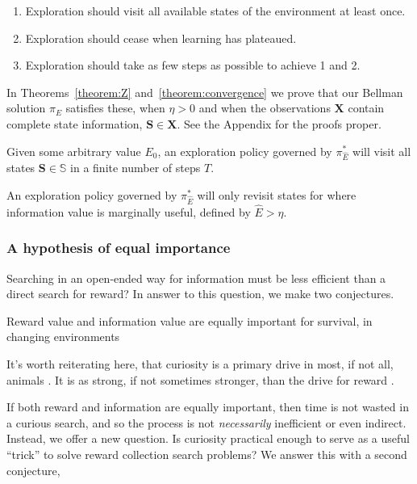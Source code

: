\begin{enumerate}
	\item Exploration should visit all available states of the environment at least once.
	\item Exploration should cease when learning has plateaued.
	\item Exploration should take as few steps as possible to achieve 1 and 2.
\end{enumerate}

In Theorems~\ref{theorem:Z} and~\ref{theorem:convergence} we prove that our Bellman solution $\pi_E$ satisfies these, when $\eta > 0$ and when the observations $\mathbf{X}$ contain complete state information, $\mathbf{S} \in \mathbf{X}$. See the Appendix for the proofs proper.

\begin{theorem} 
	\label{theorem:Z} 
	Given some arbitrary value $E_0$, an exploration policy governed by $\pi^*_{\hat E}$ will visit all states $\mathbf{S} \in \mathbb{S}$ in a finite number of steps $T$.
\end{theorem}

\begin{theorem} 
	\label{theorem:convergence} 
	An exploration policy governed by $\pi^*_{\hat E}$ will only revisit states for where information value is marginally useful, defined by $\hat E > \eta$.  
\end{theorem}


\subsubsection*{A hypothesis of equal importance}
 Searching in an open-ended way for information must be less efficient than a direct search for reward? In answer to this question, we make two conjectures.

\begin{conjecture}
	Reward value and information value are equally important for survival, in changing environments 
\end{conjecture}

It's worth reiterating here, that curiosity is a primary drive in most, if not all, animals \cite{Inglis2001}. It is as strong, if not sometimes stronger, than the drive for reward \cite{Loewenstein1994,Kidd2015,Gottlieb2018}.

If both reward and information are equally important, then time is not wasted in a curious search, and so the process is not \textit{necessarily} inefficient or even indirect. Instead, we offer a new question. Is curiosity practical enough to serve as a useful ``trick'' to solve reward collection search problems? We answer this with a second conjecture,

